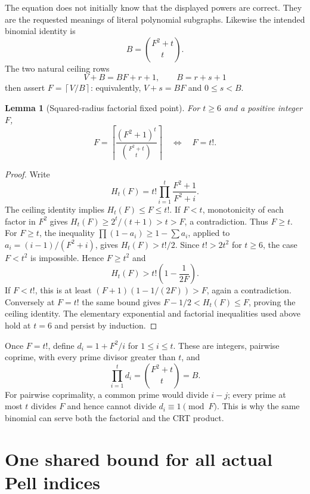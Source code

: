 \documentclass[11pt]{article}
\newtheorem{lemma}[theorem]{Lemma}
\theoremstyle{definition}\newtheorem{definition}[theorem]{Definition}
\theoremstyle{remark}\newtheorem{remark}[theorem]{Remark}
\newcommand{\ceil}[1]{\left\lceil#1\right\rceil}
\begin{document}
The equation does not initially know that the displayed powers are correct. They are the requested meanings of literal polynomial subgraphs. Likewise the intended binomial identity is
\begin{equation}\label{eq:binomial}
 B=\binom{F^2+t}{t}.
\end{equation}
The two natural ceiling rows
\begin{equation}\label{eq:ceiling}
 V+B=BF+r+1,\qquad B=r+s+1
\end{equation}
then assert $F=\ceil{V/B}$: equivalently, $V+s=BF$ and $0\le s<B$.

\begin{lemma}[Squared-radius factorial fixed point]\label{lem:factorial}
For $t\ge6$ and a positive integer $F$,
\[
 F=\ceil{\frac{(F^2+1)^t}{\binom{F^2+t}{t}}}
 \quad\Longleftrightarrow\quad F=t!.
\]
\end{lemma}
\begin{proof}
Write
\[
 H_t(F)=t!\prod_{i=1}^t\frac{F^2+1}{F^2+i}.
\]
The ceiling identity implies $H_t(F)\le F\le t!$. If $F<t$, monotonicity of each factor in $F^2$ gives
$H_t(F)\ge2^t/(t+1)>t>F$, a contradiction. Thus $F\ge t$.
For $F\ge t$, the inequality $\prod(1-a_i)\ge1-\sum a_i$, applied to
$a_i=(i-1)/(F^2+i)$, gives $H_t(F)>t!/2$.
Since $t!>2t^2$ for $t\ge6$, the case $F<t^2$ is impossible. Hence $F\ge t^2$ and
\[
 H_t(F)>t!\left(1-\frac1{2F}\right).
\]
If $F<t!$, this is at least $(F+1)(1-1/(2F))>F$, again a contradiction. Conversely at $F=t!$ the same bound gives $F-1/2<H_t(F)\le F$, proving the ceiling identity. The elementary exponential and factorial inequalities used above hold at $t=6$ and persist by induction.
\end{proof}

Once $F=t!$, define $d_i=1+F^2/i$ for $1\le i\le t$. These are integers, pairwise coprime, with every prime divisor greater than $t$, and
\begin{equation}\label{eq:reciprocal}
 \prod_{i=1}^t d_i=\binom{F^2+t}{t}=B.
\end{equation}
For pairwise coprimality, a common prime would divide $i-j$; every prime at most $t$ divides $F$ and hence cannot divide $d_i\equiv1\pmod F$. This is why the same binomial can serve both the factorial and the CRT product.

\section{One shared bound for all actual Pell indices}
\end{document}
